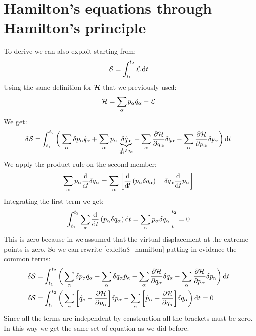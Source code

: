 \section{Hamilton's equations through Hamilton's principle}
To derive \hamiltonref\;we can also exploit \hpquotemath\;starting from:
\begin{equation}
    \mathcal{S} = \int_{t_1}^{t_2}\mathcal{L} \dd{t}
\end{equation}
Using the same definition for $\mathcal{H}$ that we previously used:
\begin{equation}
    \mathcal{H} = \displaystyle\sum_{\alpha}p_{\alpha}\dot{q}_{\alpha} - \mathcal{L}
\end{equation}
We get:
\begin{equation} \label{e:deltaS_hamilton}
    \delta \action = \int_{t_1}^{t_2}\bbrackets{\bigsum_{\alpha}\delta p_{\alpha}\dot{q}_{\alpha} + \bigsum_{\alpha} p_{\alpha} \underbrace{\delta \dot{q}_{\alpha}}_{\frac{\dd{}}{\dd{t}}\delta q_{\alpha}} - \bigsum_{\alpha} \pdv{\hamfun}{q_{\alpha}} \delta q_{\alpha}- \bigsum_{\alpha} \pdv{\hamfun}{p_{\alpha}} \delta p_{\alpha}} \dd{t}
\end{equation}
We apply the product rule on the second member:
\begin{equation}
    \bigsum_{\alpha} p_{\alpha} \dv{}{t}\delta q_{\alpha} = \bigsum_{\alpha} \bigg[ \dv{}{t} \brackets{p_{\alpha} \delta q_{\alpha}} -  \delta q_{\alpha}\dv{}{t}p_{\alpha}\bigg]
\end{equation}
Integrating the first term we get:
\begin{equation}
    \int_{t_1}^{t_2} \bigsum_{\alpha} \dv{}{t} \brackets{p_{\alpha} \delta q_{\alpha}} \dd{t} = \bigsum_{\alpha} p_{\alpha} \delta q_{\alpha} \bigg|_{t_1}^{t_2} = 0
\end{equation}
This is zero because in \hpquotemath\;we assumed that the virtual displacement at the extreme points is zero. So we can rewrite \eqref{e:deltaS_hamilton} putting in evidence the common terms:
\begin{equation}
    \begin{split}
        \delta \action &= \int_{t_1}^{t_2}\bbrackets{\bigsum_{\alpha}\delta p_{\alpha}\dot{q}_{\alpha} - \bigsum_{\alpha} \delta q_{\alpha}\dot{p}_{\alpha} - \bigsum_{\alpha} \pdv{\hamfun}{q_{\alpha}} \delta q_{\alpha}- \bigsum_{\alpha} \pdv{\hamfun}{p_{\alpha}} \delta p_{\alpha}} \dd{t} \\
        \delta \action &= \int_{t_1}^{t_2}\bbrackets{\bigsum_{\alpha}\bigg[\dot{q}_{\alpha} - \pdv{\hamfun}{p_{\alpha}}\bigg] \delta p_{\alpha} - \bigsum_{\alpha} \bigg[\dot{p}_{\alpha} + \pdv{\hamfun}{q_{\alpha}} \bigg]\delta q_{\alpha}} \dd{t} = 0
    \end{split}
\end{equation}
Since all the terms are independent by construction all the brackets must be zero. In this way we get the same set of equation as we did before.
